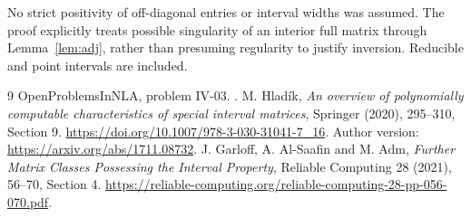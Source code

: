 No strict positivity of off-diagonal entries or interval widths was assumed. The proof explicitly treats possible singularity of an interior full matrix through Lemma~\ref{lem:adj}, rather than presuming regularity to justify inversion. Reducible and point intervals are included.
\begin{thebibliography}{9}
 OpenProblemsInNLA, problem IV-03. .
 M. Hlad\'ik, \emph{An overview of polynomially computable characteristics of special interval matrices}, Springer (2020), 295--310, Section 9. \url{https://doi.org/10.1007/978-3-030-31041-7_16}. Author version: \url{https://arxiv.org/abs/1711.08732}.
 J. Garloff, A. Al-Saafin and M. Adm, \emph{Further Matrix Classes Possessing the Interval Property}, Reliable Computing 28 (2021), 56--70, Section 4. \url{https://reliable-computing.org/reliable-computing-28-pp-056-070.pdf}.
\end{thebibliography}

